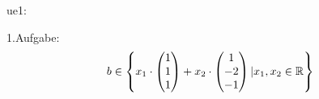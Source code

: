 ue1:

1.Aufgabe:
\begin{equation}
	\begin{split}
		b \in \left\{ x_1 \cdot \begin{pmatrix*} 1\\ 1\\ 1 \end{pmatrix*} + x_2 \cdot \begin{pmatrix*} 1\\ -2\\ -1 \end{pmatrix*} | x_1, x_2 \in \R \right\}
	\end{split}
\end{equation}
